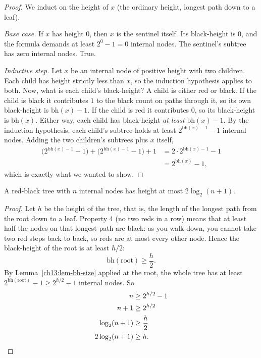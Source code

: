 \begin{proof}
We induct on the height of $x$ (the ordinary height, longest path down to a
leaf).

\emph{Base case.} If $x$ has height $0$, then $x$ is the sentinel itself. Its
black-height is $0$, and the formula demands at least $2^0 - 1 = 0$ internal
nodes. The sentinel's subtree has zero internal nodes. True.

\emph{Inductive step.} Let $x$ be an internal node of positive height with two
children. Each child has height strictly less than $x$, so the induction
hypothesis applies to both. Now, what is each child's black-height? A child is
either red or black. If the child is black it contributes $1$ to the black count
on paths through it, so its own black-height is $\mathrm{bh}(x) - 1$. If the child
is red it contributes $0$, so its black-height is $\mathrm{bh}(x)$. Either way,
each child has black-height \emph{at least} $\mathrm{bh}(x) - 1$. By the induction
hypothesis, each child's subtree holds at least $2^{\mathrm{bh}(x)-1} - 1$
internal nodes. Adding the two children's subtrees plus $x$ itself,
\begin{align*}
  \big(2^{\mathrm{bh}(x)-1} - 1\big) + \big(2^{\mathrm{bh}(x)-1} - 1\big) + 1
  &= 2 \cdot 2^{\mathrm{bh}(x)-1} - 1 \\
  &= 2^{\mathrm{bh}(x)} - 1,
\end{align*}
which is exactly what we wanted to show.
\end{proof}

\begin{theorem}\label{ch13:thm-height}
A red-black tree with $n$ internal nodes has height at most $2\log_2(n+1)$.
\end{theorem}

\begin{proof}
Let $h$ be the height of the tree, that is, the length of the longest path from
the root down to a leaf. Property 4 (no two reds in a row) means that at least
half the nodes on that longest path are black: as you walk down, you cannot take
two red steps back to back, so reds are at most every other node. Hence the
black-height of the root is at least $h/2$:
\[
  \mathrm{bh}(\text{root}) \ge \frac{h}{2}.
\]
By Lemma~\ref{ch13:lem-bh-size} applied at the root, the whole tree has at least
$2^{\mathrm{bh}(\text{root})} - 1 \ge 2^{h/2} - 1$ internal nodes. So
\begin{align*}
  n &\ge 2^{h/2} - 1 \\
  n + 1 &\ge 2^{h/2} \\
  \log_2(n+1) &\ge \frac{h}{2} \\
  2\log_2(n+1) &\ge h. \qedhere
\end{align*}
\end{proof}


